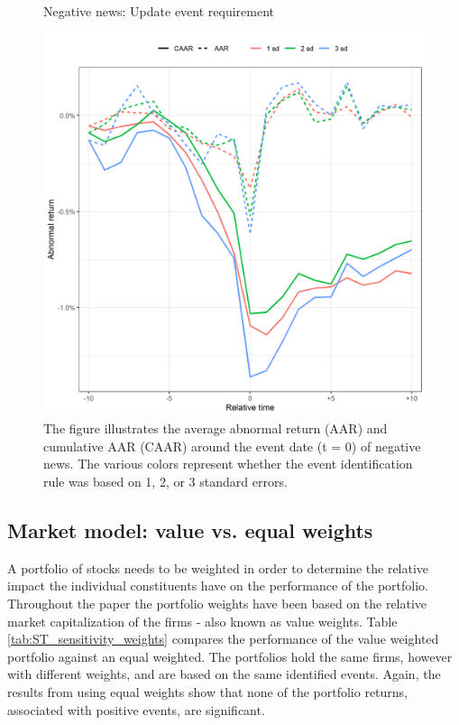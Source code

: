 \begin{figure} [h]
    \centering
    \caption{Negative news: Update event requirement}
    \includegraphics[scale=0.6]{Projekt/1.Figures analysis/ST_negative_sensitivity.png}
     \caption*{\footnotesize The figure illustrates the average abnormal return (AAR) and cumulative AAR (CAAR) around the event date (t = 0) of negative news. The various colors represent whether the event identification rule was based on 1, 2, or 3 standard errors.  }
    \label{fig:ST_neg_sensitivity}
\end{figure} 



\subsection{Market model: value vs. equal weights}

A portfolio of stocks needs to be weighted in order to determine the relative impact the individual constituents have on the performance of the portfolio. Throughout the paper the portfolio weights have been based on the relative market capitalization of the firms - also known as value weights. Table \ref{tab:ST_sensitivity_weights} compares the performance of the value weighted portfolio against an equal weighted. The portfolios hold the same firms, however with different weights, and are based on the same identified events. Again, the results from using equal weights show that none of the portfolio returns, associated with positive events, are significant. 

